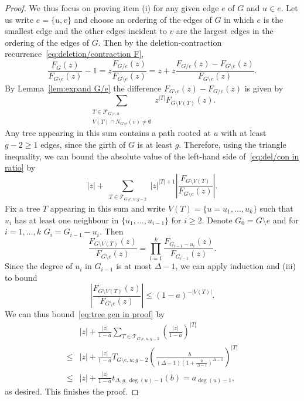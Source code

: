 \documentclass[a4paper,11pt,reqno]{amsart}
\numberwithin{equation}{section}
\begin{document}
\begin{proof}
We thus focus on proving item (i) for any given edge $e$ of $G$ and $u\in e$.
Let us write $e=\{u,v\}$ and choose an ordering of the edges of $G$ in which $e$ is the smallest edge and the other edges incident to $v$ are the largest edges in the ordering of the edges of $G$.
Then by the deletion-contraction recurrence~\eqref{eq:deletion/contraction F}, 
\begin{equation}\label{eq:del/con in ratio}
\frac{F_G(z)}{F_{G\setminus e}(z)}-1=z\frac{F_{G/e}(z)}{F_{G\setminus e}(z)}=z+z\frac{F_{G/e}(z)-F_{G\setminus e}(z)}{F_{G\setminus e}(z)}.
 \end{equation}
By Lemma~\ref{lem:expand G/e} the difference $F_{G\setminus e}(z)-F_{G/e}(z)$ is given by
\[
\sum_{\substack{T\in \mathcal{F}_{G\setminus e,u}\\ V(T)\cap 
N_{G\setminus e}(v)\neq \emptyset}} z^{|T|}F_{G\setminus V(T)}(z).
\]
Any tree appearing in this sum contains a path rooted at $u$ with at least $g-2\ge 1$ edges, since the girth of $G$ is at least $g$.
Therefore, using the triangle inequality, we can bound the absolute value of the left-hand side of~\eqref{eq:del/con in ratio} by
\begin{equation}\label{eq:tree gen in proof}
|z|+\sum_{\substack{T\in \mathcal{T}_{G\setminus e,u;g-2}}}|z|^{|T|+1}\left|\frac{F_{G\setminus V(T)}}{F_{G\setminus e}(z)}\right|.
\end{equation}
Fix a tree $T$ appearing in this sum and write $V(T)=\{u=u_1,\ldots,u_k\}$ such that $u_i$ has at least one neighbour in $\{u_1,\ldots,u_{i-1}\}$ for $i\geq 2$. Denote $G_0=G\setminus e$ and for $i=1,\ldots, k$ $G_i=G_{i-1}-u_i$.
Then 
\begin{equation}\label{eq:telescope}
\frac{F_{G\setminus V(T)}(z)}{F_{G\setminus e}(z)}=\prod_{i=1}^k \frac{F_{G_{i-1}-u_i}(z)}{F_{G_{i-1}}(z)}.
\end{equation}
Since the degree of $u_i$ in $G_{i-1}$ is at most $\Delta-1$, we can apply induction and (iii) to bound 
\[
\left|
\frac{F_{G\setminus V(T)}(z)}{F_{G\setminus e}(z)}\right|\leq (1-a)^{-|V(T)|}.
\]
We can thus bound~\eqref{eq:tree gen in proof} by
\begin{align*}
&|z|+\frac{|z|}{1-a}\sum_{T\in \mathcal{T}_{G\setminus e,u;g-2}}\left(\frac{|z|}{1-a}\right)^{|T|} 
\\
\leq &|z|+\frac{|z|}{1-a}T_{G\setminus e,u;g-2}\left(\frac{b}{(\Delta-1)(1+\tfrac{b}{\Delta-1})^{\Delta-1}}\right)^{|T|}
\\
\leq &|z|+\frac{|z|}{1-a}t_{\Delta,g,\deg(u)-1}(b)= a_{\deg(u)-1},
\end{align*}
as desired.
This finishes the proof.
\end{proof}
\end{document}
